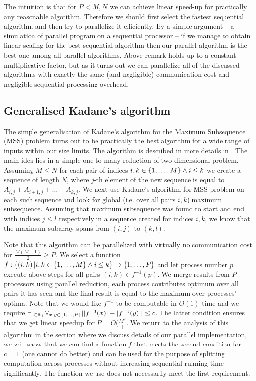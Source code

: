 The intuition is that for $P < M, N$ we can achieve linear speed-up for practically any reasonable algorithm.
Therefore we should first select the fastest sequential algorithm and then try to parallelize it efficiently.
By a simple argument -- a simulation of parallel program on a sequential processor -- if we manage to obtain linear scaling for the best sequential algorithm then our parallel algorithm is the best one among all parallel algorithms.
Above remark holds up to a constant multiplicative factor, but as it turns out we can parallelize all of the discussed algorithms with exactly the same (and negligible) communication cost and negligible sequential processing overhead.

\subsection*{Generalised Kadane's algorithm}

The simple generalisation of Kadane's algorithm for the Maximum Subsequence (MSS) problem turns out to be practically the best algorithm for a wide range of inputs within our size limits.
The algorithm is described in more details in \cite{Pearls}.
The main idea lies in a simple one-to-many reduction of two dimensional problem.
Assuming $M \leq N$ for each pair of indices $i, k \in \{ 1, \dots, M \} \land i \leq k$ we create a sequence of length $N$, where $j$-th element of the new sequence is equal to $A_{i,j} + A_{i+1,j} + \dots + A_{k,j}$.
We next use Kadane's algorithm for MSS problem on each such sequence and look for global (i.e. over all pairs $i, k$) maximum subsequence.
Assuming that maximum subsequence was found to start and end with indices $j \leq l$ respectively in a sequence created for indices $i, k$, we know that the maximum subarray spans from $(i, j)$ to $(k, l)$.

Note that this algorithm can be parallelized with virtually no communication cost for $\frac{M (M - 1)}{2} \geq P$.
We select a function $f : \{ (i, k) \| i, k \in \{ 1, \dots, M \} \land i \leq k \} \to \{ 1, \dots, P \}$ and let process number $p$ execute above steps for all pairs $(i, k) \in f^{-1}(p)$.
We merge results from $P$ processors using parallel reduction, each process contributes optimum over all pairs it has seen and the final result is equal to the maximum over processes' optima.
Note that we would like $f^{-1}$ to be computable in $O(1)$ time and we require $\exists_{c \in \mathbb{R}_+}{\forall_{x, y \in \{ 1, \dots, P \}}{||f^{-1}(x)| - |f^{-1}(y)|| \leq c}}$.
The latter condition ensures that we get linear speedup for $P = O(\frac{M^2})$.
We return to the analysis of this algorithm in the section where we discuss details of our parallel implementation, we will show that we can find a function $f$ that meets the second condition for $c = 1$ (one cannot do better) and can be used for the purpose of splitting computation across processes without increasing sequential running time significantly.
The function we use does not necessarily meet the first requirement.

